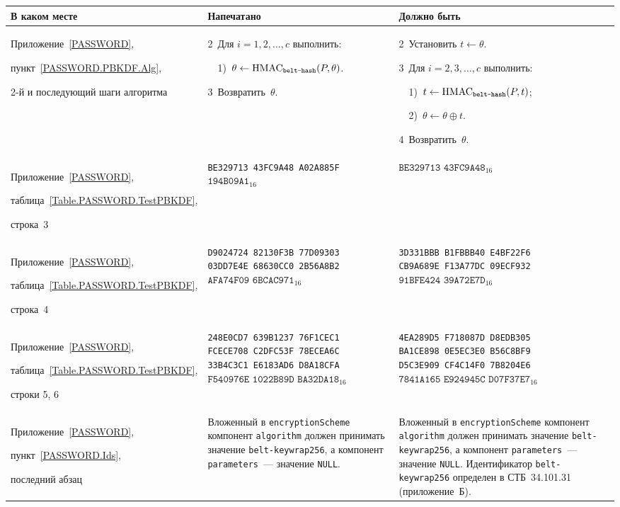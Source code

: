 \begin{center}
\begin{tabular}{|p{3.3cm}|p{6.1cm}|p{6.1cm}|}
\hline
В каком месте & Напечатано & Должно быть\\
\hline
\hline
Приложение~\ref{PASSWORD},\par
пункт~\ref{PASSWORD.PBKDF.Alg},\par
2-й и последующий шаги алгоритма &
%
2~Для $i=1,2,\ldots,c$ выполнить:\par
\mbox{}~~1)~$\theta\leftarrow\text{\normalfont HMAC}_{\texttt{belt-hash}}(P,\theta)$.\par
3~Возвратить~$\theta$.
&
2~Установить $t\leftarrow\theta$.\par
3~Для $i=2,3,\ldots,c$ выполнить:\par
\mbox{}~~1)~$t\leftarrow\text{\normalfont HMAC}_{\texttt{belt-hash}}(P,t)$;\par
\mbox{}~~2)~$\theta\leftarrow\theta\oplus t$.\par
4~Возвратить~$\theta$.\\
%
\hline
Приложение~\ref{PASSWORD},\par
таблица~\ref{Table.PASSWORD.TestPBKDF},\par
строка~3 &
%
\texttt{BE329713~43FC9A48~A02A885F} $\texttt{194B09A1}_{16}$ &
%
$\texttt{BE329713~43FC9A48}_{16}$\\
\hline
Приложение~\ref{PASSWORD},\par
таблица~\ref{Table.PASSWORD.TestPBKDF},\par
строка~4 &
%
\texttt{D9024724~82130F3B~77D09303} \texttt{03DD7E4E~68630CC0~2B56A8B2}
$\texttt{AFA74F09~6BCAC971}_{16}$
&
\texttt{3D331BBB~B1FBBB40~E4BF22F6} \texttt{CB9A689E~F13A77DC~09ECF932}
$\texttt{91BFE424~39A72E7D}_{16}$
\\
\hline
Приложение~\ref{PASSWORD},\par
таблица~\ref{Table.PASSWORD.TestPBKDF},\par
строки 5, 6 &
%
\texttt{248E0CD7~639B1237~76F1CEC1} \texttt{FCECE708~C2DFC53F~78ECEA6C}
\texttt{33B4C3C1~E6183AD6~D8A18CFA} $\texttt{F540976E~1022B89D~BA32DA18}_{16}$
&
\texttt{4EA289D5~F718087D~D8EDB305} \texttt{BA1CE898~0E5EC3E0~B56C8BF9}
\texttt{D5C3E909~CF4C14F0~7B8204E6} $\texttt{7841A165~E924945C~D07F37E7}_{16}$
\\
\hline
Приложение~\ref{PASSWORD},\par
пункт~\ref{PASSWORD.Ids},\par
последний абзац &
Вложенный в \texttt{encryptionScheme} компонент \texttt{algorithm}
должен принимать значение \texttt{belt-keywrap256},
а компонент \texttt{parameters}~--- значение \texttt{NULL}.
&
Вложенный в \texttt{encryptionScheme} компонент \texttt{algorithm}
должен принимать значение \texttt{belt-keywrap256},
а компонент \texttt{parameters}~--- значение \texttt{NULL}.
%
Идентификатор \texttt{belt-keywrap256} 
определен в СТБ~34.101.31 (приложение~Б).
\\
\hline
\end{tabular}
\end{center}